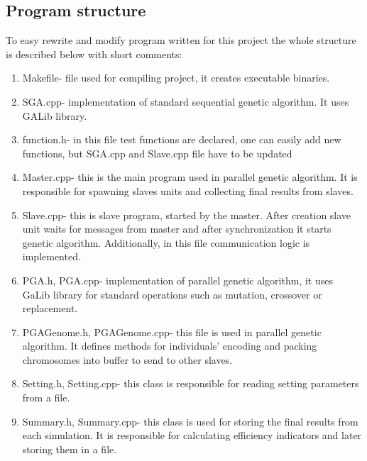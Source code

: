 \subsection{Program structure}
To easy rewrite and modify program written for this project the whole structure
is described below with short comments:
\begin{enumerate}
	\item Makefile- file used for compiling project, it creates executable
		binaries.
	\item SGA.cpp- implementation of standard sequential genetic algorithm. It
		uses GALib library.
	\item function.h- in this file test functions are declared, one can easily
		add new functions, but SGA.cpp and Slave.cpp file have to be updated
	\item Master.cpp- this is the main program used in parallel genetic algorithm.
		It is responsible for spawning slaves units and collecting final results
		from slaves.
	\item Slave.cpp- this is slave program, started by the master. After
		creation slave unit waits for messages from master and after
		synchronization it starts genetic algorithm. Additionally, in this file
		communication logic is implemented. 
	\item PGA.h, PGA.cpp- implementation of parallel genetic algorithm, it uses
		GaLib library for standard operations such as mutation, crossover or
		replacement.
	\item PGAGenome.h, PGAGenome.cpp- this file is used in parallel genetic
		algorithm. It defines methods for individuals' encoding and packing
		chromosomes into buffer to send to other slaves.
	\item Setting.h, Setting.cpp- this class is responsible for reading setting
		parameters from a file. 
	\item Summary.h, Summary.cpp- this class is used for storing the final
		results from each simulation. It is responsible for calculating
		efficiency indicators and later storing them in a file. 
\end{enumerate}


